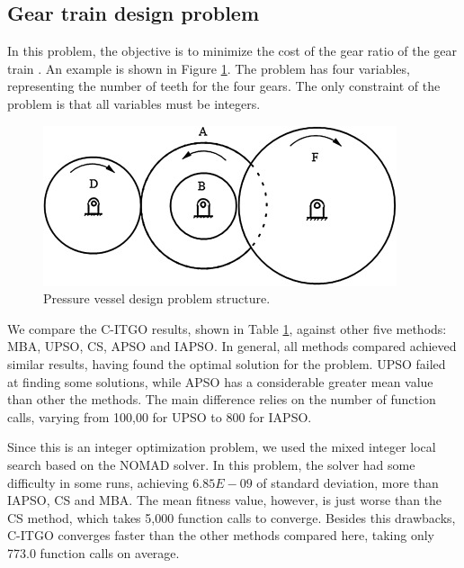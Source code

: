 \subsection{Gear train design problem}

In this problem, the objective is to minimize the cost of the gear ratio of the gear train \citep{PV}. An example is shown in Figure \ref{fig:GT}. The problem has four variables, representing the number of teeth for the four gears. The only constraint of the problem is that all variables must be integers.


\begin{figure}[h]
\begin{center}
\includegraphics[scale=0.6]{Imgs/GT.jpg}
\end{center}
\captionsetup{justification=centering}
\caption{Pressure vessel design problem structure.}\label{fig:GT}
\end{figure}


We compare the C-ITGO results, shown in Table \ref{fig:GT}, against other five methods: MBA, UPSO, CS, APSO and IAPSO. In general, all methods compared achieved similar results, having found the optimal solution for the problem. UPSO failed at finding some solutions, while APSO has a considerable greater mean value than other the methods.
The main difference relies on the number of function calls, varying from 100,00 for UPSO to 800 for IAPSO.




Since this is an integer optimization problem, we used the mixed integer local search based on the NOMAD solver. In this problem, the solver had some difficulty in some runs, achieving $6.85E \! - \! 09$ of standard deviation, more than IAPSO, CS and MBA. The mean fitness value, however, is just worse than the CS method, which takes 5,000 function calls to converge. Besides this drawbacks, C-ITGO converges faster than the other methods compared here, taking only 773.0 function calls on average.



